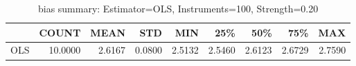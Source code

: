 \begin{table}[ht]
\centering
\caption{bias summary: Estimator=OLS, Instruments=100, Strength=0.20}
\begin{tabular}{lrrrrrrrr}
\toprule
 & COUNT & MEAN & STD & MIN & 25\% & 50\% & 75\% & MAX \\
\midrule
OLS & 10.0000 & 2.6167 & 0.0800 & 2.5132 & 2.5460 & 2.6123 & 2.6729 & 2.7590 \\
\bottomrule
\end{tabular}
\end{table}
